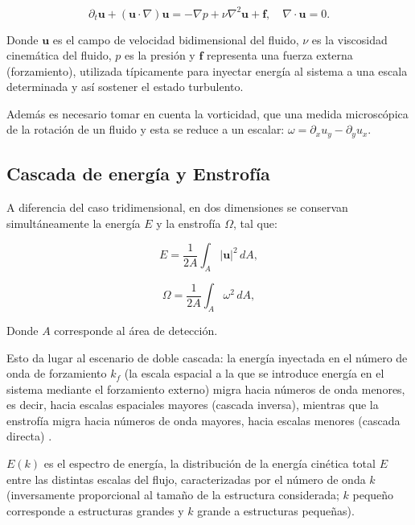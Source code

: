 \begin{equation}
\partial_t \mathbf{u} + (\mathbf{u}\cdot\nabla)\mathbf{u} = -\nabla p + \nu \nabla^2 \mathbf{u} + \mathbf{f}, \quad \nabla\cdot\mathbf{u}=0.
\end{equation}

Donde $\mathbf{u}$ es el campo de velocidad 
bidimensional del fluido, 
$\nu$ es la viscosidad cinemática del fluido,  
$p$ es la presión y $\mathbf{f}$ representa una fuerza externa (forzamiento), utilizada típicamente 
para inyectar energía al sistema a una escala determinada y así sostener 
el estado turbulento.

Además es necesario tomar en cuenta 
la vorticidad, que una medida microscópica de la rotación de un fluido
y esta se reduce a un escalar: $\omega=\partial_x u_y - \partial_y u_x$.

\subsection{Cascada de energía y Enstrofía}

A diferencia del caso tridimensional, en dos dimensiones se conservan simultáneamente 
la energía $E$ y la enstrofía $\Omega$, tal que: 

\begin{equation}
E = \frac{1}{2A}\int_A |\mathbf{u}|^2\, dA,
\label{eq:energia}
\end{equation}

\begin{equation}
\Omega = \frac{1}{2A}\int_A \omega^2\, dA,
\label{eq:enstrofia}
\end{equation}

Donde $A$ corresponde al área de detección.

Esto da lugar al escenario de doble cascada: la energía inyectada en el número de 
onda de forzamiento $k_f$ (la escala espacial a la que se introduce energía en 
el sistema mediante el forzamiento externo) migra hacia números de onda menores, 
es decir, hacia escalas espaciales mayores (cascada inversa), mientras que la 
enstrofía migra hacia números de onda mayores, hacia escalas menores (cascada 
directa) \cite{boffetta2010}. 

$E(k)$ es el espectro de energía, la 
distribución de la energía cinética total $E$ entre las distintas escalas del 
flujo, caracterizadas por el número de onda $k$ (inversamente proporcional al tamaño 
de la estructura considerada; $k$ pequeño corresponde a estructuras grandes y 
$k$ grande a estructuras pequeñas). 

